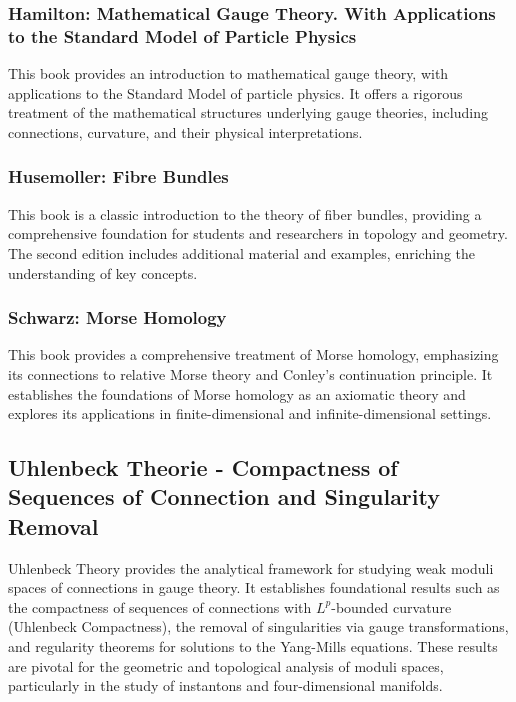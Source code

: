 \documentclass[10pt, letterpaper]{article}
\theoremstyle{custom}
\theoremstyle{definition}
\begin{document}
\subsubsection{Hamilton: Mathematical Gauge Theory. With Applications to the Standard
Model of Particle Physics \cite{hamilton2017gauge}}
This book provides an introduction to mathematical gauge theory, with applications to the Standard Model of particle physics. It offers a rigorous treatment of the mathematical structures underlying gauge theories, including connections, curvature, and their physical interpretations.


\subsubsection{Husemoller: Fibre Bundles \cite{husemoller1975fibre}}
This book is a classic introduction to the theory of fiber bundles, providing a comprehensive foundation for students and researchers in topology and geometry. The second edition includes additional material and examples, enriching the understanding of key concepts.


\subsubsection{Schwarz: Morse Homology \cite{schwarz1993morse}}
This book provides a comprehensive treatment of Morse homology, emphasizing its connections to relative Morse theory and Conley's continuation principle. It establishes the foundations of Morse homology as an axiomatic theory and explores its applications in finite-dimensional and infinite-dimensional settings.

\subsection{Uhlenbeck Theorie - Compactness of Sequences of Connection and Singularity Removal} Uhlenbeck Theory provides the analytical framework for studying weak moduli spaces of connections in gauge theory. It establishes foundational results such as the compactness of sequences of connections with $L^p$-bounded curvature (Uhlenbeck Compactness), the removal of singularities via gauge transformations, and regularity theorems for solutions to the Yang-Mills equations. These results are pivotal for the geometric and topological analysis of moduli spaces, particularly in the study of instantons and four-dimensional manifolds.
\end{document}
